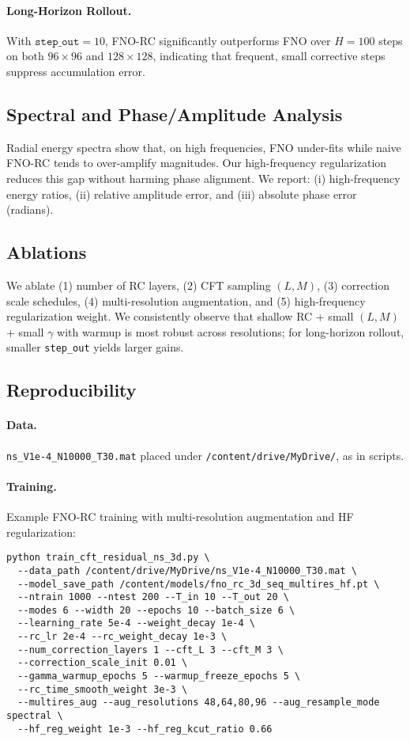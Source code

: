 \paragraph{Long-Horizon Rollout.} With $\texttt{step\_out}=10$, FNO-RC significantly outperforms FNO over $H=100$ steps on both $96\times 96$ and $128\times 128$, indicating that frequent, small corrective steps suppress accumulation error.

\subsection{Spectral and Phase/Amplitude Analysis}
Radial energy spectra show that, on high frequencies, FNO under-fits while naive FNO-RC tends to over-amplify magnitudes. Our high-frequency regularization reduces this gap without harming phase alignment. We report: (i) high-frequency energy ratios, (ii) relative amplitude error, and (iii) absolute phase error (radians).

\subsection{Ablations}
We ablate (1) number of RC layers, (2) CFT sampling $(L,M)$, (3) correction scale schedules, (4) multi-resolution augmentation, and (5) high-frequency regularization weight. We consistently observe that shallow RC + small $(L,M)$ + small $\gamma$ with warmup is most robust across resolutions; for long-horizon rollout, smaller \texttt{step\_out} yields larger gains.

\subsection{Reproducibility}
\paragraph{Data.} \verb|ns_V1e-4_N10000_T30.mat| placed under \verb|/content/drive/MyDrive/|, as in scripts.

\paragraph{Training.} Example FNO-RC training with multi-resolution augmentation and HF regularization:
\begin{verbatim}
python train_cft_residual_ns_3d.py \
  --data_path /content/drive/MyDrive/ns_V1e-4_N10000_T30.mat \
  --model_save_path /content/models/fno_rc_3d_seq_multires_hf.pt \
  --ntrain 1000 --ntest 200 --T_in 10 --T_out 20 \
  --modes 6 --width 20 --epochs 10 --batch_size 6 \
  --learning_rate 5e-4 --weight_decay 1e-4 \
  --rc_lr 2e-4 --rc_weight_decay 1e-3 \
  --num_correction_layers 1 --cft_L 3 --cft_M 3 \
  --correction_scale_init 0.01 \
  --gamma_warmup_epochs 5 --warmup_freeze_epochs 5 \
  --rc_time_smooth_weight 3e-3 \
  --multires_aug --aug_resolutions 48,64,80,96 --aug_resample_mode spectral \
  --hf_reg_weight 1e-3 --hf_reg_kcut_ratio 0.66
\end{verbatim}

